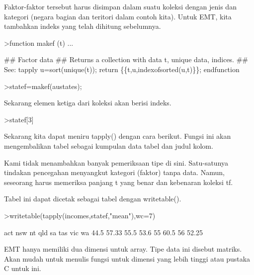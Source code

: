 \documentclass[a4paper,10pt]{article}
\begin{document}
\begin{eulernotebook}
\begin{eulercomment}
Faktor-faktor tersebut harus disimpan dalam suatu koleksi dengan jenis
dan kategori (negara bagian dan teritori dalam contoh kita). Untuk
EMT, kita tambahkan indeks yang telah dihitung sebelumnya.
\end{eulercomment}
\begin{eulerprompt}
>function makef (t) ...
\end{eulerprompt}
\begin{eulerudf}
  ## Factor data
  ## Returns a collection with data t, unique data, indices.
  ## See: tapply
  u=sort(unique(t));
  return \{\{t,u,indexofsorted(u,t)\}\};
  endfunction
\end{eulerudf}
\begin{eulerprompt}
>statef=makef(austates);
\end{eulerprompt}
\begin{eulercomment}
Sekarang elemen ketiga dari koleksi akan berisi indeks.
\end{eulercomment}
\begin{eulerprompt}
>statef[3]
\end{eulerprompt}
\begin{euleroutput}
  [6,  5,  4,  2,  2,  3,  8,  8,  4,  7,  2,  7,  4,  4,  5,  6,  5,  3,
  8,  7,  4,  2,  2,  8,  5,  1,  2,  7,  7,  1]
\end{euleroutput}
\begin{eulercomment}
Sekarang kita dapat meniru tapply() dengan cara berikut. Fungsi ini
akan mengembalikan tabel sebagai kumpulan data tabel dan judul kolom.
\end{eulercomment}
\begin{eulercomment}
Kami tidak menambahkan banyak pemeriksaan tipe di sini. Satu-satunya
tindakan pencegahan menyangkut kategori (faktor) tanpa data. Namun,
seseorang harus memeriksa panjang t yang benar dan kebenaran koleksi
tf.

Tabel ini dapat dicetak sebagai tabel dengan writetable().
\end{eulercomment}
\begin{eulerprompt}
>writetable(tapply(incomes,statef,"mean"),wc=7)
\end{eulerprompt}
\begin{euleroutput}
      act    nsw     nt    qld     sa    tas    vic     wa
     44.5  57.33   55.5   53.6     55   60.5     56  52.25
\end{euleroutput}
\begin{eulercomment}
EMT hanya memiliki dua dimensi untuk array. Tipe data ini disebut
matriks. Akan mudah untuk menulis fungsi untuk dimensi yang lebih
tinggi atau pustaka C untuk ini.


\end{eulercomment}
\end{eulernotebook}
\end{document}
